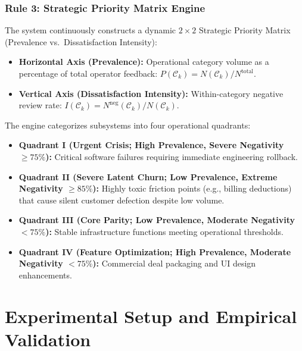 \documentclass[5p,twocolumn,authoryear]{elsarticle}
\begin{document}
\subsubsection{Rule 3: Strategic Priority Matrix Engine}
The system continuously constructs a dynamic $2 \times 2$ Strategic Priority Matrix (Prevalence vs.\ Dissatisfaction Intensity):
\begin{itemize}
    \item \textbf{Horizontal Axis (Prevalence):} Operational category volume as a percentage of total operator feedback: $P(\mathcal{C}_k) = N(\mathcal{C}_k) / N^{\text{total}}$.
    \item \textbf{Vertical Axis (Dissatisfaction Intensity):} Within-category negative review rate: $I(\mathcal{C}_k) = N^{\text{neg}}(\mathcal{C}_k) / N(\mathcal{C}_k)$.
\end{itemize}
The engine categorizes subsystems into four operational quadrants:
\begin{itemize}
    \item \textbf{Quadrant I (Urgent Crisis; High Prevalence, Severe Negativity $\ge 75\%$):} Critical software failures requiring immediate engineering rollback.
    \item \textbf{Quadrant II (Severe Latent Churn; Low Prevalence, Extreme Negativity $\ge 85\%$):} Highly toxic friction points (e.g., billing deductions) that cause silent customer defection despite low volume.
    \item \textbf{Quadrant III (Core Parity; Low Prevalence, Moderate Negativity $< 75\%$):} Stable infrastructure functions meeting operational thresholds.
    \item \textbf{Quadrant IV (Feature Optimization; High Prevalence, Moderate Negativity $< 75\%$):} Commercial deal packaging and UI design enhancements.
\end{itemize}

\section{Experimental Setup and Empirical Validation}
\label{sec:experimental_setup}
\end{document}
